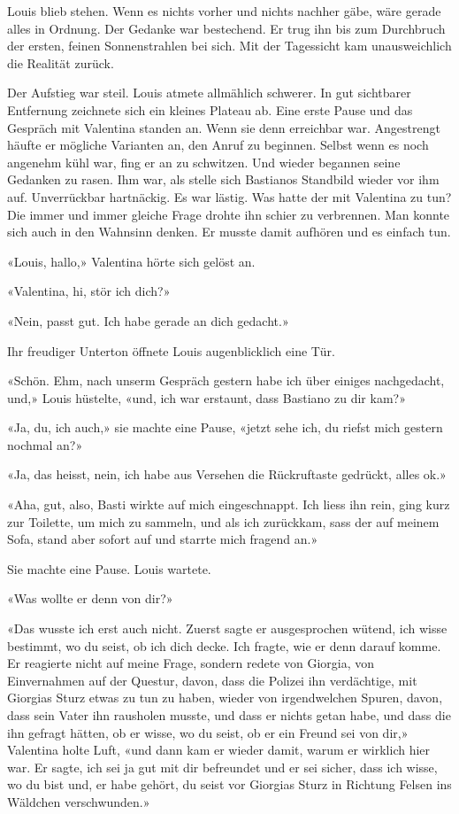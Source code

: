 Louis blieb stehen. Wenn es nichts vorher und nichts nachher gäbe, wäre
gerade alles in Ordnung. Der Gedanke war bestechend. Er trug ihn bis zum
Durchbruch der ersten, feinen Sonnenstrahlen bei sich. Mit der
Tagessicht kam unausweichlich die Realität zurück.

Der Aufstieg war steil. Louis atmete allmählich schwerer. In gut
sichtbarer Entfernung zeichnete sich ein kleines Plateau ab. Eine erste
Pause und das Gespräch mit Valentina standen an. Wenn sie denn
erreichbar war. Angestrengt häufte er mögliche Varianten an, den Anruf
zu beginnen. Selbst wenn es noch angenehm kühl war, fing er an zu
schwitzen. Und wieder begannen seine Gedanken zu rasen. Ihm war, als
stelle sich Bastianos Standbild wieder vor ihm auf. Unverrückbar
hartnäckig. Es war lästig. Was hatte der mit Valentina zu tun? Die immer
und immer gleiche Frage drohte ihn schier zu verbrennen. Man konnte sich
auch in den Wahnsinn denken. Er musste damit aufhören und es einfach
tun.

«Louis, hallo,» Valentina hörte sich gelöst an.

«Valentina, hi, stör ich dich?»

«Nein, passt gut. Ich habe gerade an dich gedacht.»

Ihr freudiger Unterton öffnete Louis augenblicklich eine Tür.

«Schön. Ehm, nach unserm Gespräch gestern habe ich über einiges
nachgedacht, und,» Louis hüstelte, «und, ich war erstaunt, dass Bastiano
zu dir kam?»

«Ja, du, ich auch,» sie machte eine Pause, «jetzt sehe ich, du riefst
mich gestern nochmal an?»

«Ja, das heisst, nein, ich habe aus Versehen die Rückruftaste gedrückt,
alles ok.»

«Aha, gut, also, Basti wirkte auf mich eingeschnappt. Ich liess ihn
rein, ging kurz zur Toilette, um mich zu sammeln, und als ich zurückkam,
sass der auf meinem Sofa, stand aber sofort auf und starrte mich fragend
an.»

Sie machte eine Pause. Louis wartete.

«Was wollte er denn von dir?»

«Das wusste ich erst auch nicht. Zuerst sagte er ausgesprochen wütend,
ich wisse bestimmt, wo du seist, ob ich dich decke. Ich fragte, wie er
denn darauf komme. Er reagierte nicht auf meine Frage, sondern redete
von Giorgia, von Einvernahmen auf der Questur, davon, dass die Polizei
ihn verdächtige, mit Giorgias Sturz etwas zu tun zu haben, wieder von
irgendwelchen Spuren, davon, dass sein Vater ihn rausholen musste, und
dass er nichts getan habe, und dass die ihn gefragt hätten, ob er wisse,
wo du seist, ob er ein Freund sei von dir,» Valentina holte Luft, «und
dann kam er wieder damit, warum er wirklich hier war. Er sagte, ich sei
ja gut mit dir befreundet und er sei sicher, dass ich wisse, wo du bist
und, er habe gehört, du seist vor Giorgias Sturz in Richtung Felsen ins
Wäldchen verschwunden.»

